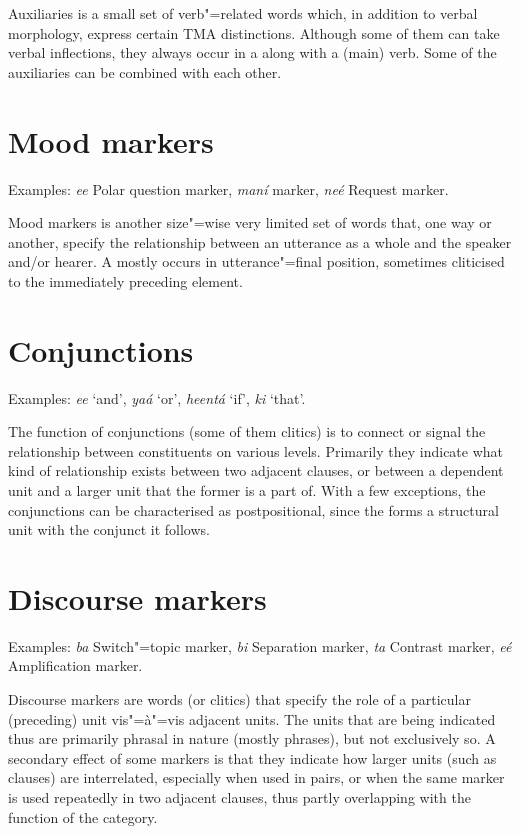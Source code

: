 Auxiliaries is a small set of verb"=related words which, in addition to verbal morphology, express certain TMA distinctions. Although some of them can take verbal inflections, they always occur in a  along with a (main) verb. Some of the auxiliaries can be combined with each other.


\section{Mood markers}
\label{sec:3b-11}
Examples: \textit{ee} Polar question marker, \textit{maní}  marker, \textit{neé} Request marker.


Mood markers is another size"=wise very limited set of words that, one way or another, specify the relationship between an utterance as a whole and the speaker and/or hearer. A  mostly occurs in utterance"=final position, sometimes cliticised to the immediately preceding element.


\section{Conjunctions}
\label{sec:3b-12}
Examples: \textit{ee} `and', \textit{yaá} `or', \textit{heentá} `if', \textit{ki} `that'.


The function of conjunctions (some of them clitics) is to connect or signal the relationship between constituents on various levels. Primarily they indicate what kind of relationship exists between two adjacent clauses, or between a dependent unit and a larger unit that the former is a part of. With a few exceptions, the conjunctions can be characterised as postpositional, since the  forms a structural unit with the conjunct it follows.


\section{Discourse markers}
\label{sec:3b-13}
Examples: \textit{ba} Switch"=topic marker, \textit{bi} Separation marker, \textit{ta} Contrast marker, \textit{eé} Amplification marker. 


Discourse markers are words (or clitics) that specify the  role of a particular (preceding) unit vis"=à"=vis adjacent units. The units that are being indicated thus are primarily phrasal in nature (mostly  phrases), but not exclusively so. A secondary effect of some  markers is that they indicate how larger units (such as clauses) are interrelated, especially when used in pairs, or when the same marker is used repeatedly in two adjacent clauses, thus partly overlapping with the function of the  category.


